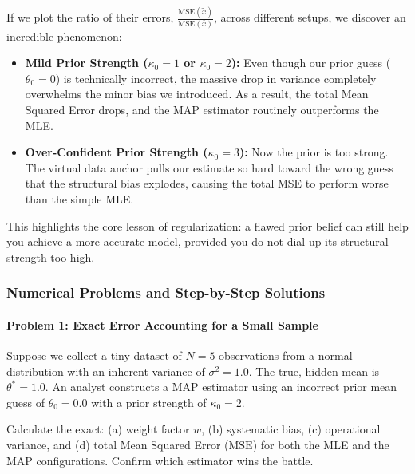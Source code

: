 \documentclass{article}
\begin{document}
If we plot the ratio of their errors, $\frac{\text{MSE}(\tilde{x})}{\text{MSE}(\bar{x})}$, across different setups, we discover an incredible phenomenon:
\begin{itemize}
    \item \textbf{Mild Prior Strength ($\kappa_0 = 1$ or $\kappa_0 = 2$):} Even though our prior guess ($\theta_0 = 0$) is technically incorrect, the massive drop in variance completely overwhelms the minor bias we introduced. As a result, the total Mean Squared Error drops, and the MAP estimator routinely outperforms the MLE.
    \item \textbf{Over-Confident Prior Strength ($\kappa_0 = 3$):} Now the prior is too strong. The virtual data anchor pulls our estimate so hard toward the wrong guess that the structural bias explodes, causing the total MSE to perform worse than the simple MLE.
\end{itemize}

This highlights the core lesson of regularization: a flawed prior belief can still help you achieve a more accurate model, provided you do not dial up its structural strength too high.

\subsubsection{Numerical Problems and Step-by-Step Solutions}

\paragraph{Problem 1: Exact Error Accounting for a Small Sample}
Suppose we collect a tiny dataset of $N = 5$ observations from a normal distribution with an inherent variance of $\sigma^2 = 1.0$. The true, hidden mean is $\theta^* = 1.0$. An analyst constructs a MAP estimator using an incorrect prior mean guess of $\theta_0 = 0.0$ with a prior strength of $\kappa_0 = 2$. 

Calculate the exact: (a) weight factor $w$, (b) systematic bias, (c) operational variance, and (d) total Mean Squared Error ($\text{MSE}$) for both the MLE and the MAP configurations. Confirm which estimator wins the battle.
\end{document}
